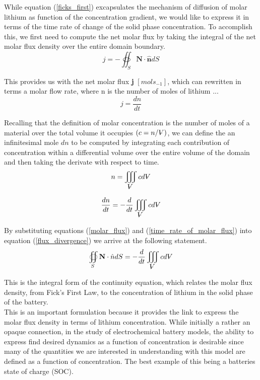 \documentclass[lettersize,journal]{IEEEtran}
\newcommand{\volume}{{\ooalign{\hfil$V$\hfil\cr\kern0.08em--\hfil\cr}}}
\begin{document}
While equation (\ref{ficks_first}) excapsulates the mechanism of diffusion of molar lithium as function of the concentration gradient, we would like to express it in terms of the time rate of change of the solid phase concentration. To accomplish this, we first need to compute the net molar flux by taking the integral of the net molar flux density over the entire domain boundary.
\begin{equation}\label{flux_divergence}
  j = -\oiint_{S} \textbf{N} \cdot \hat{\textbf{n}}dS
\end{equation}

This provides us with the net molar flux \textbf{j} $ [mols_{-1}]$, which can rewritten in terms a molar flow rate, where n is the number of moles of lithium ...
\begin{equation}\label{molar_flux}
    j = \frac{dn}{dt}
\end{equation}

Recalling that the definition of molar concentration is the number of moles of a material over the total volume it occupies $\left( c = n / \volume \right)$, we can define the an infinitesimal mole $dn$ to be computed by integrating each contribution of concentration within a differential volume over the entire volume of the domain and then taking the derivate with respect to time.
\begin{equation}
    n = \iiint_{\volume} cd{\volume}
\end{equation}

\begin{equation}\label{time_rate_of_molar_flux}
  \frac{dn}{dt} = -\frac{d}{dt} \iiint_{\volume} cd{\volume}
\end{equation}

\noindent By substituting equations (\ref{molar_flux}) and (\ref{time_rate_of_molar_flux}) into equation (\ref{flux_divergence}) we arrive at the following statement.
\begin{equation}\label{COM_s_int_form}
  \oiint_S \textbf{N} \cdot \hat{n}dS = -\frac{d}{dt} \iiint_{\volume} c d{\volume}
\end{equation}

This is the integral form of the continuity equation, which relates the molar flux density, from Fick's First Law, to the concentration of lithium in the solid phase of the battery. \\

\noindent This is an important formulation because it provides the link to express the molar flux density in terms of lithium concentration. While initially a rather an opaque connection, in the study of electrochemical battery models, the ability to express find desired dynamics as a function of concentration is desirable since many of the quantities we are interested in understanding with this model are defined as a function of concentration. The best example of this being a batteries state of charge (SOC). \\
\end{document}
